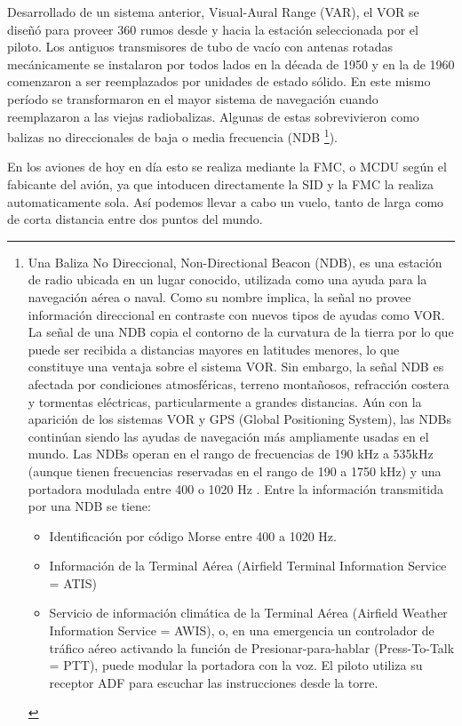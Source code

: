 Desarrollado de un sistema anterior, Visual-Aural Range (VAR), el VOR se diseñó para proveer 360 rumos desde y hacia la estación seleccionada por el piloto. Los antiguos transmisores de tubo de vacío con antenas rotadas mecánicamente se instalaron por todos lados en la década de 1950 y en la de 1960 comenzaron a ser reemplazados por unidades de estado sólido. En este mismo período se transformaron en el mayor sistema de navegación cuando reemplazaron a las viejas radiobalizas. Algunas de estas sobrevivieron como balizas no direccionales de baja o media frecuencia (NDB \footnote{Una Baliza No Direccional,  Non-Directional Beacon (NDB), es una estación de radio ubicada en un lugar conocido, utilizada como una ayuda para la navegación aérea o naval. Como su nombre implica, la señal no provee información direccional en contraste con nuevos tipos de ayudas como VOR. La señal de una NDB copia el contorno de la curvatura de la tierra por lo que puede ser recibida a distancias mayores en latitudes menores, lo que constituye una ventaja sobre el sistema VOR. Sin embargo, la señal NDB es afectada por condiciones atmosféricas, terreno montañosos, refracción costera y tormentas eléctricas, particularmente a grandes distancias. Aún con la aparición de los sistemas VOR y GPS (Global Positioning System), las NDBs continúan siendo las ayudas de navegación más ampliamente usadas en el mundo. Las NDBs operan en el rango de frecuencias de 190 kHz a 535kHz (aunque tienen frecuencias reservadas en el rango de 190 a 1750 kHz) y una portadora modulada entre  400 o 1020 Hz \cite{NDB}. Entre la información transmitida por una NDB se tiene:

\begin{itemize}
 \item Identificación por código Morse entre 400 a 1020 Hz.
\item Información de la Terminal Aérea (Airfield Terminal Information Service = ATIS)
\item Servicio de información climática de la Terminal Aérea (Airfield Weather Information Service = AWIS), o, en una emergencia un controlador de tráfico aéreo activando la función de Presionar-para-hablar (Press-To-Talk = PTT), puede modular la portadora con la voz. El piloto utiliza su receptor ADF para escuchar las instrucciones desde la torre.
\end{itemize}
}).

En los aviones de hoy en día esto se realiza mediante la FMC, o MCDU según el fabicante del avión, ya que intoducen directamente la SID y la FMC la realiza automaticamente sola. Así podemos llevar a cabo un vuelo, tanto de larga como de corta distancia entre dos puntos del mundo.

